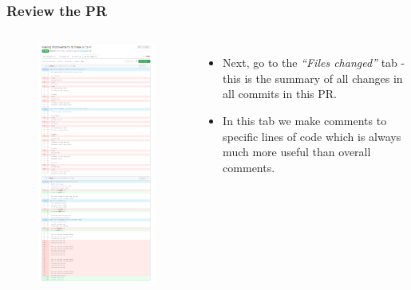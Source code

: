 \documentclass[aspectratio=169]{beamer}
\begin{document}
\begin{frame}
	\frametitle{Review the PR}
	\begin{columns}[c]

		\vspace{-.2cm}
		\begin{figure}
			\centering
			\includegraphics[width=.6\textwidth]{./img/review-1.png}
		\end{figure}

		\begin{itemize}
			\setlength\itemsep{1.5em}
			\item Next, go to the \textit{``Files changed''} tab
			- this is the summary of all changes in all commits in this PR.
			\item In this tab we make comments to specific lines of code which is always much more useful than overall comments.
		\end{itemize}

	\end{columns}
\end{frame}
\end{document}
